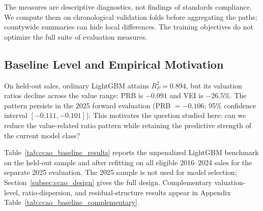\documentclass[10pt]{article}
\theoremstyle{definition}
\newcommand{\1}{\mathbf{1}}
\begin{document}
The measures are descriptive diagnostics, not findings of standards compliance. We compute them on chronological validation folds before aggregating the paths; countywide summaries can hide local differences. The training objectives do not optimize the full suite of evaluation measures.


\subsection{Baseline Level and Empirical Motivation}
\label{subsec:baseline_tension}

On held-out sales, ordinary LightGBM attains $R^2_P=0.894$, but its valuation ratios decline across the value range: PRB is $-0.091$ and VEI is $-26.5\%$. The pattern persists in the 2025 forward evaluation (PRB $=-0.106$; 95\% confidence interval $[-0.111,-0.101]$). This motivates the question studied here: can we reduce the value-related ratio pattern while retaining the predictive strength of the current model class?

Table~\ref{tab:ccao_baseline_results} reports the unpenalized LightGBM benchmark on the held-out sample and after refitting on all eligible 2016--2024 sales for the separate 2025 evaluation. The 2025 sample is not used for model selection; Section~\ref{subsec:ccao_design} gives the full design. Complementary valuation-level, ratio-dispersion, and residual-structure results appear in Appendix Table~\ref{tab:ccao_baseline_complementary}.

\end{document}
